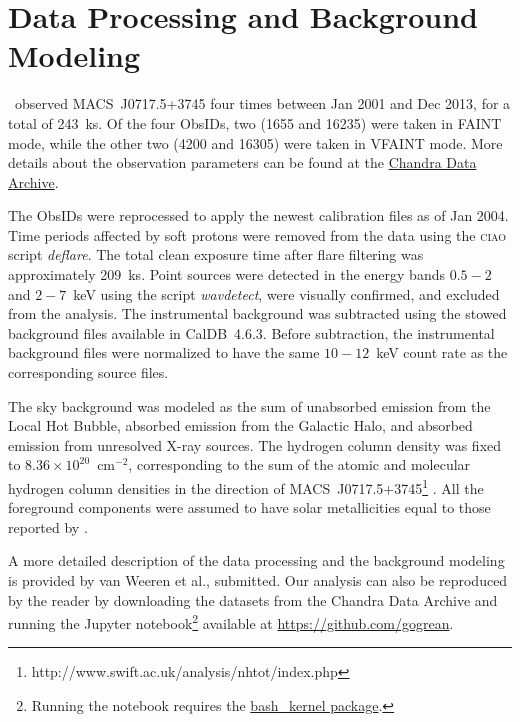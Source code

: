 \section{Data Processing and Background Modeling}
\label{sec:DataAnalysis}

\chandra\ observed MACS~J0717.5+3745 four times between Jan 2001 and Dec 2013, for a total of 243~ks. Of the four ObsIDs, two (1655 and 16235) were taken in FAINT mode, while the other two (4200 and 16305) were taken in VFAINT mode. More details about the observation parameters can be found at the \href{http://cda.harvard.edu/chaser/}{Chandra Data Archive}.

The ObsIDs were reprocessed to apply the newest calibration files as of Jan 2004. Time periods affected by soft protons were removed from the data using the \textsc{ciao} script \emph{deflare}. The total clean exposure time after flare filtering was approximately 209~ks. Point sources were detected in the energy bands $0.5-2$ and $2-7$~keV using the script \emph{wavdetect}, were visually confirmed, and excluded from the analysis. The instrumental background was subtracted using the stowed background files available in CalDB~4.6.3. Before subtraction, the instrumental background files were normalized to have the same $10-12$~keV count rate as the corresponding source files. 

The sky background was modeled as the sum of unabsorbed emission from the Local Hot Bubble, absorbed emission from the Galactic Halo, and absorbed emission from unresolved X-ray sources. The hydrogen column density was fixed to $8.36\times 10^{20}$~cm$^{-2}$, corresponding to the sum of the atomic and molecular hydrogen column densities in the direction of MACS~J0717.5+3745\footnote{http://www.swift.ac.uk/analysis/nhtot/index.php} \citep{Kalberla2005, Willingale2013}. All the foreground components were assumed to have solar metallicities equal to those reported by \citet{Feldman1992}. 

A more detailed description of the data processing and the background modeling is provided by van Weeren et al., submitted. Our analysis can also be reproduced by the reader by downloading the datasets from the Chandra Data Archive and running the Jupyter notebook\footnote{Running the notebook requires the \href{https://github.com/takluyver/bash\_kernel}{bash\_kernel package}.} available at \url{https://github.com/gogrean}. 
